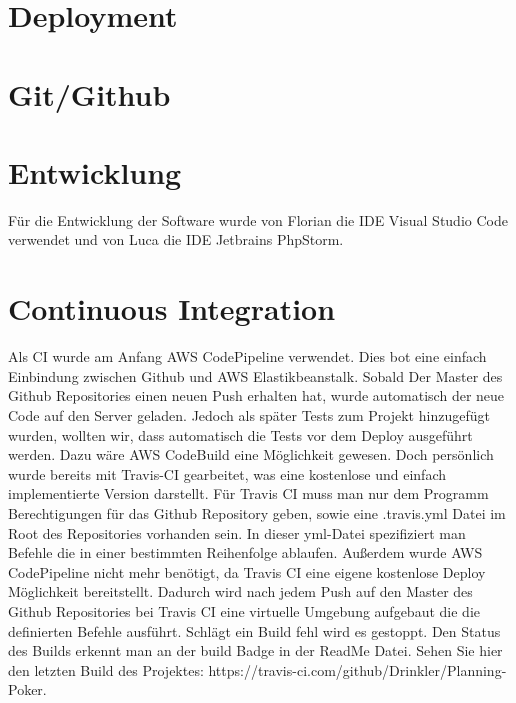 
\chapter{Deployment}
\chapter{Git/Github}

\chapter{Entwicklung}
Für die Entwicklung der Software wurde von Florian die IDE Visual Studio Code verwendet und von Luca die IDE Jetbrains PhpStorm.


\chapter{Continuous Integration}
Als CI wurde am Anfang AWS CodePipeline verwendet. Dies bot eine einfach Einbindung zwischen Github und AWS Elastikbeanstalk. Sobald Der Master des Github Repositories einen neuen Push erhalten hat, wurde automatisch der neue Code auf den Server geladen. Jedoch als später Tests zum Projekt hinzugefügt wurden, wollten wir, dass automatisch die Tests vor dem Deploy ausgeführt werden. Dazu wäre AWS CodeBuild eine Möglichkeit gewesen. Doch persönlich wurde bereits mit Travis-CI gearbeitet, was eine kostenlose und einfach implementierte Version darstellt. Für Travis CI muss man nur dem Programm Berechtigungen für das Github Repository geben, sowie eine .travis.yml Datei im Root des Repositories vorhanden sein. In dieser yml-Datei spezifiziert man Befehle die in einer bestimmten Reihenfolge ablaufen. Außerdem wurde AWS CodePipeline nicht mehr benötigt, da Travis CI eine eigene kostenlose Deploy Möglichkeit bereitstellt.
Dadurch wird nach jedem Push auf den Master des Github Repositories bei Travis CI eine virtuelle Umgebung aufgebaut die die definierten Befehle ausführt. Schlägt ein Build fehl wird es gestoppt. Den Status des Builds erkennt man an der build Badge in der ReadMe Datei. Sehen Sie hier den letzten Build des Projektes: https://travis-ci.com/github/Drinkler/Planning-Poker.